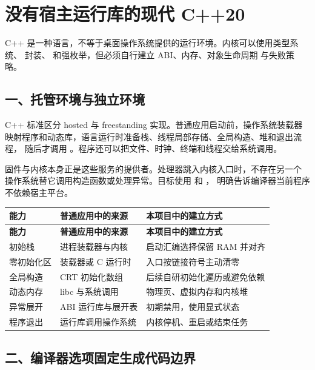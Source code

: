 \section{没有宿主运行库的现代 C++20}

\begin{keyidea}
C++ 是一种语言，不等于桌面操作系统提供的运行环境。内核可以使用类型系统、
封装、 和强枚举，但必须自行建立 ABI、内存、对象生命周期
与失败策略。
\end{keyidea}

\subsection{一、托管环境与独立环境}

C++ 标准区分 hosted 与 freestanding 实现。普通应用启动前，操作系统装载器
映射程序和动态库，语言运行时准备栈、线程局部存储、全局构造、堆和退出流程，
随后才调用 。程序还可以把文件、时钟、终端和线程交给系统调用。

固件与内核本身正是这些服务的提供者。处理器跳入内核入口时，不存在另一个
操作系统替它调用构造函数或处理异常。目标使用
 和 ，
明确告诉编译器当前程序不依赖宿主平台。

\begin{longtable}{L{0.23\textwidth}L{0.29\textwidth}L{0.32\textwidth}}
\toprule
\textbf{能力} & \textbf{普通应用中的来源} & \textbf{本项目中的建立方式}\\
\midrule
\endfirsthead
\toprule
\textbf{能力} & \textbf{普通应用中的来源} & \textbf{本项目中的建立方式}\\
\midrule
\endhead
初始栈 & 进程装载器与内核 & 启动汇编选择保留 RAM 并对齐\\
零初始化区 & 装载器或 C 运行时 & 入口按链接符号主动清零\\
全局构造 & CRT 初始化数组 & 后续自研初始化遍历或避免依赖\\
动态内存 & libc 与系统调用 & 物理页、虚拟内存和内核堆\\
异常展开 & ABI 运行库与展开表 & 初期禁用，使用显式状态\\
程序退出 & 运行库调用操作系统 & 内核停机、重启或结束任务\\
\bottomrule
\end{longtable}

\subsection{二、编译器选项固定生成代码边界}

